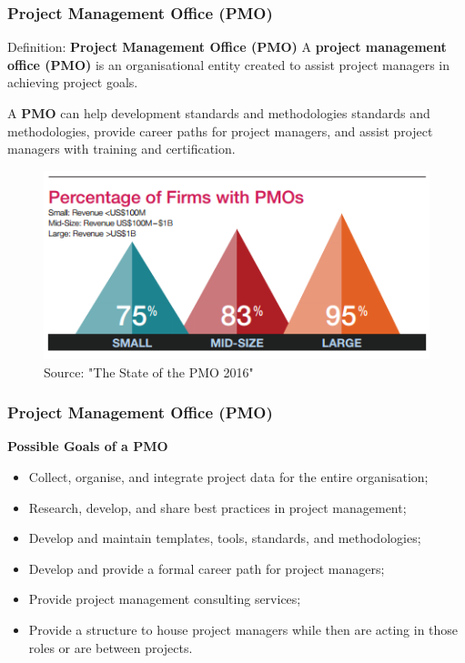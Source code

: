 \documentclass[aspectratio=169]{beamer}
\begin{document}
\begin{frame}
\frametitle{Project Management Office (PMO)}
\begin{block}{Definition: \textbf{Project Management Office (PMO)}}
A \textbf{project management office (PMO)} is an organisational entity created to assist project managers in achieving project goals.
\end{block}
\vspace{0.2cm}
A \textbf{PMO} can help development standards and methodologies standards and methodologies, provide career paths for project managers, and assist project managers with training and certification.
\begin{figure}
\includegraphics[scale=0.35]{PMO}
\caption{Source: "The State of the PMO 2016"}
\end{figure}
\end{frame}

\begin{frame}
\frametitle{Project Management Office (PMO)}
\textbf{Possible Goals of a PMO}
\vspace{0.5cm}
\begin{itemize}
\item Collect, organise, and integrate project data for the entire organisation;
\item Research, develop, and share best practices in project management;
\item Develop and maintain templates, tools, standards, and methodologies;
\item Develop and provide a formal career path for project managers;
\item Provide project management consulting services;
\item Provide a structure to house project managers while then are acting in those roles or are between projects.
\end{itemize}
\end{frame}
\end{document}
